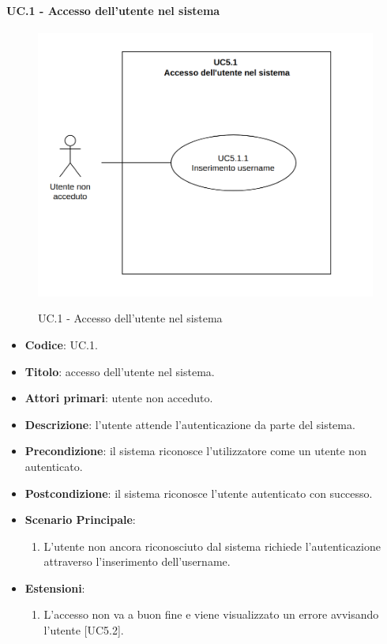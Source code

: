 	\paragraph{UC\theuccount.1 - Accesso dell'utente nel sistema}
		\begin{figure}[H]
			\centering
				\includegraphics[width=\columnwidth]{img/UC5_1.png}\\
			\caption{UC\theuccount.1 - Accesso dell'utente nel sistema}
		\end{figure}
		\begin{itemize}
			\item \textbf{Codice}: UC\theuccount.1.
			\item \textbf{Titolo}: accesso dell'utente nel sistema.
			\item \textbf{Attori primari}: utente non acceduto.
			\item \textbf{Descrizione}: l'utente attende l'autenticazione da parte del sistema.
			\item \textbf{Precondizione}: il sistema riconosce l'utilizzatore come un utente non autenticato.
			\item \textbf{Postcondizione}: il sistema riconosce l'utente autenticato con successo.
			\item \textbf{Scenario Principale}:
			\begin{enumerate}
				\item L’utente non ancora riconosciuto dal sistema richiede l'autenticazione attraverso l'inserimento dell'username.
			\end{enumerate}
			\item \textbf{Estensioni}:
			\begin{enumerate}
				\item L'accesso non va a buon fine e viene visualizzato un errore avvisando l'utente [UC5.2].
			\end{enumerate}
	\end{itemize}


